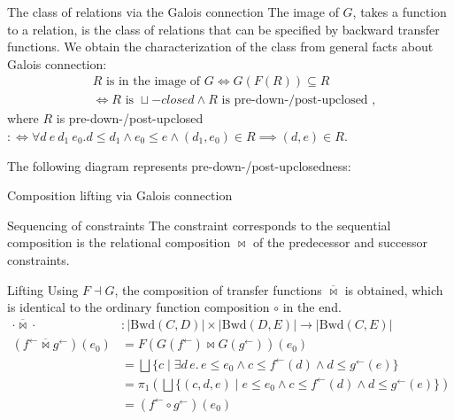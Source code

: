 \documentclass{beamer}
\newcommand{\Unidir}{\mathrm{Bwd}}
\newcommand{\fb}{{f^{\leftarrow}}}
\newcommand{\gb}{{g^{\leftarrow}}}
\newcommand{\join}{\sqcup}
\newcommand{\bigjoin}{\bigsqcup}
\newcommand{\comp}{\circ}
\newcommand{\bowtielift}{\mathbin{\overline{\bowtie}}}
\newcommand{\rotleq}{\rotatebox[origin=c]{90}{$\leq$}}
\begin{document}
\begin{frame} [fragile] {The class of relations via the Galois connection}
  The image of $G$, takes a function to a relation, is the class of relations that can be specified by backward transfer functions. We obtain the characterization of the class from general facts about Galois connection:
  \begin{align*}
  &R \text{ is in the image of } G \iff G(F(R)) \subseteq R  \\
                                &\iff
                                  R \text{ is }\join-{ closed } \land R \text{ is pre-down-/post-upclosed },
  \end{align*}
  where $R$ is pre-down-/post-upclosed $:\Leftrightarrow \forall d\ e\ d_{1 }\ e_{0}. d \leq d_{1} \land e_{0} \leq e \land (d_{1}, e_{0}) \in R \implies (d, e) \in R$.

  The following diagram represents pre-down-/post-upclosedness:
  \begin{center}
  \end{center}
\end{frame}
\begin{frame} {Composition lifting via Galois connection}
  \begin{block}{Sequencing of constraints}
    The constraint corresponds to the sequential composition is the relational composition $\bowtie$ of the predecessor and successor constraints.
  \end{block}
  \begin{block}{Lifting}
    Using $F \dashv G$, the composition of transfer functions $\bowtielift$ is obtained, which is identical to the ordinary function composition $\comp$ in the end.
    \begin{align*}
      \cdot \bowtielift \cdot &: \left| \Unidir(C, D) \right| \times  \left| \Unidir(D, E) \right| \to  \left| \Unidir(C, E) \right| \\
      (\fb \bowtielift \gb) (e_{0}) &= F(G(\fb) \bowtie G(\gb)) (e_{0}) \\
                                  &= \bigjoin \{ c \mid \exists d\, e.\,e \leq e_{0} \land c \leq \fb(d) \land d \leq \gb(e) \} \\
                                  &= \pi_{1} (\bigjoin \{ (c, d , e) \mid e \leq e_{0} \land c \leq \fb(d) \land d \leq \gb(e) \}) \\
                                  &= (\fb \comp \gb)(e_{0})
    \end{align*}
  \end{block}
\end{frame}
\end{document}
